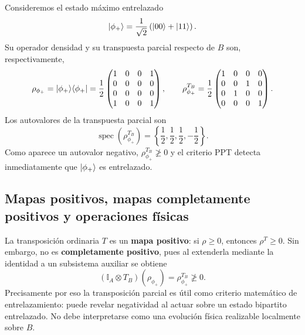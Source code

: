 \documentclass[12pt,a4paper]{article}
\theoremstyle{definition}
\theoremstyle{plain}
\theoremstyle{remark}
\newcommand{\I}{\mathbb{I}}
\newcommand{\proj}[1]{\ket{#1}\!\bra{#1}}
\begin{document}
Consideremos el estado máximo entrelazado
\begin{equation*}
    \ket{\phi_+}
    =\frac{1}{\sqrt{2}}
    \left(\ket{00}+\ket{11}\right).
\end{equation*}
Su operador densidad y su transpuesta parcial respecto de $B$ son, respectivamente,
\begin{equation*}
    \rho_{\phi_+}
    =\proj{\phi_+}
    =\frac{1}{2}
    \begin{pmatrix}
        1 & 0 & 0 & 1\\
        0 & 0 & 0 & 0\\
        0 & 0 & 0 & 0\\
        1 & 0 & 0 & 1
    \end{pmatrix},
    \qquad
    \rho_{\phi_+}^{T_B}
    =\frac{1}{2}
    \begin{pmatrix}
        1 & 0 & 0 & 0\\
        0 & 0 & 1 & 0\\
        0 & 1 & 0 & 0\\
        0 & 0 & 0 & 1
    \end{pmatrix}.
\end{equation*}
Los autovalores de la transpuesta parcial son
\begin{equation*}
    \operatorname{spec}\left(\rho_{\phi_+}^{T_B}\right)
    =\left\{\frac{1}{2},\frac{1}{2},\frac{1}{2},-\frac{1}{2}\right\}.
\end{equation*}
Como aparece un autovalor negativo, $\rho_{\phi_+}^{T_B}\ngeq 0$ y el criterio PPT detecta inmediatamente que $\ket{\phi_+}$ es entrelazado.

\subsection{Mapas positivos, mapas completamente positivos y operaciones físicas}

La transposición ordinaria $T$ es un \textbf{mapa positivo}: si $\rho\geq 0$, entonces $\rho^{T}\geq 0$. Sin embargo, no es \textbf{completamente positivo}, pues al extenderla mediante la identidad a un subsistema auxiliar se obtiene
\begin{equation*}
    (\I_A\otimes T_B)(\rho_{\phi_+})
    =\rho_{\phi_+}^{T_B}\ngeq 0.
\end{equation*}
Precisamente por eso la transposición parcial es útil como criterio matemático de entrelazamiento: puede revelar negatividad al actuar sobre un estado bipartito entrelazado. No debe interpretarse como una evolución física realizable localmente sobre $B$.
\end{document}
